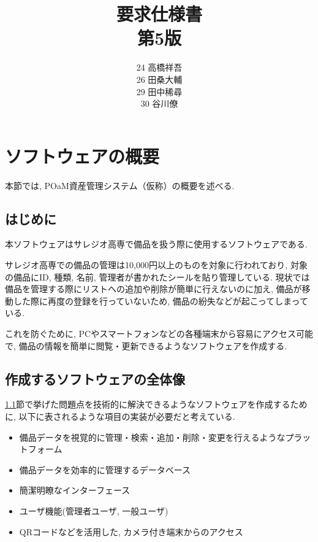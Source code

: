 \documentclass[11ptm]{jsarticle}
\title{{\Huge 要求仕様書}\\第5版}
\author{24 高橋祥吾\\26 田桑大輔\\29 田中稀尋\\30 谷川僚}
\date{}
\begin{document}
\setcounter{page}{0}

\maketitle
\thispagestyle{empty}

\clearpage

\setcounter{page}{0}
\thispagestyle{empty}

\tableofcontents
\clearpage


\section{ソフトウェアの概要}
\label{sec:ソフトウェアの概要}
本節では, POaM資産管理システム（仮称）の概要を述べる.

\subsection{はじめに}
\label{subsec:はじめに}
本ソフトウェアはサレジオ高専で備品を扱う際に使用するソフトウェアである. \par
サレジオ高専での備品の管理は10,000円以上のものを対象に行われており, 対象の備品にID, 種類, 名前, 管理者が書かれたシールを貼り管理している. 現状では備品を管理する際にリストへの追加や削除が簡単に行えないのに加え, 備品が移動した際に再度の登録を行っていないため, 備品の紛失などが起こってしまっている.\par
これを防ぐために, PCやスマートフォンなどの各種端末から容易にアクセス可能で, 備品の情報を簡単に閲覧・更新できるようなソフトウェアを作成する.

\subsection{作成するソフトウェアの全体像}
\label{subsec:作成するソフトウェアの全体像}
\ref{subsec:はじめに}節で挙げた問題点を技術的に解決できるようなソフトウェアを作成するために, 以下に表されるような項目の実装が必要だと考えている.
\begin{itemize}
  \item 備品データを視覚的に管理・検索・追加・削除・変更を行えるようなプラットフォーム
  \item 備品データを効率的に管理するデータベース
  \item 簡潔明瞭なインターフェース
  \item ユーザ機能(管理者ユーザ, 一般ユーザ)
  \item QRコードなどを活用した, カメラ付き端末からのアクセス
\end{itemize}
\end{document}

